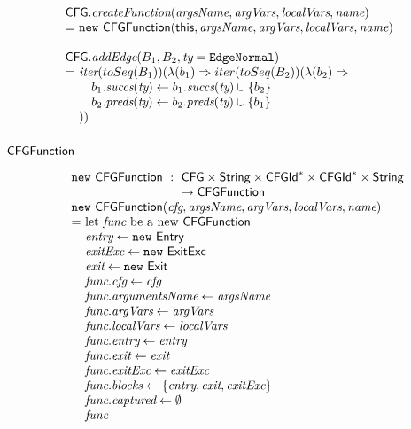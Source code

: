 \[
\begin{array}{l@{}l@{~}l}
\lefteqn{\CFG.\emph{createFunction}(\emph{argsName}, \emph{argVars}, \emph{localVars}, \emph{name})}\\
& = & \new\ \CFGFunction(\this, \emph{argsName}, \emph{argVars}, \emph{localVars}, \emph{name})\\
& & \\

\lefteqn{\CFG.\emph{addEdge}(B_1, B_2, \emph{ty} = \EdgeNormal)}\\
& = & \iter(toSeq(B_1))(\lambda(b_1) \Rightarrow iter(toSeq(B_2))(\lambda(b_2) \Rightarrow \\
& & \quad b_1.\emph{succs}(\emph{ty}) \leftarrow b_1.\emph{succs}(\emph{ty}) \cup \{b_2\} \\
& & \quad b_2.\emph{preds}(\emph{ty}) \leftarrow b_2.\emph{preds}(\emph{ty}) \cup \{b_1\} \\
& & )) \\
\end{array}
\]

\subsubsection{$\mbox{\textsf{CFGFunction}}$}
\[
\begin{array}{l@{}l@{~}l}
\lefteqn{\new \ \CFGFunction \ : \ \CFG \times \String \times \CFGId^{*} \times \CFGId^{*} \times \String}\\
\lefteqn{\phantom{\new \ \CFGFunction \ : \ }\rightarrow \CFGFunction}\\
\lefteqn{\new\ \CFGFunction(\emph{cfg}, \emph{argsName}, \emph{argVars}, \emph{localVars}, \emph{name})}\\
& = & \text{let } \emph{func} \text{ be a new } \CFGFunction\\
& & \emph{entry} \leftarrow \new\ \Entry\\
& & \emph{exitExc} \leftarrow \new\ \ExitExc\\
& & \emph{exit} \leftarrow \new\ \Exit\\
& & \emph{func}.\emph{cfg} \leftarrow \emph{cfg} \\
& & \emph{func}.\emph{argumentsName} \leftarrow \emph{argsName} \\
& & \emph{func}.\emph{argVars} \leftarrow \emph{argVars}\\
& & \emph{func}.\emph{localVars} \leftarrow \emph{localVars}\\
& & \emph{func}.\emph{entry} \leftarrow \emph{entry}\\
& & \emph{func}.\emph{exit} \leftarrow \emph{exit}\\
& & \emph{func}.\emph{exitExc} \leftarrow \emph{exitExc}\\
& & \emph{func}.\emph{blocks} \leftarrow \{ \emph{entry}, \emph{exit}, \emph{exitExc} \}
~~~~~~~~~~~~~~~~~~~~~~~~~~~~\\
& & \emph{func}.\emph{captured} \leftarrow \emptyset\\
& & \emph{func}\\
\end{array}
\]

